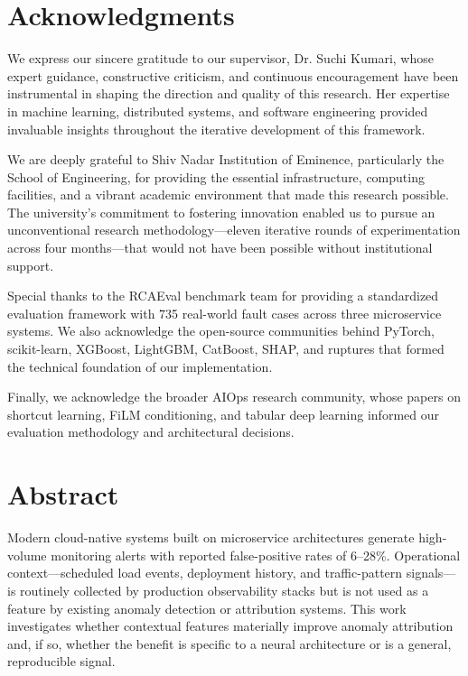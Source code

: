 \documentclass[12pt,a4paper]{report}
\begin{document}
\newpage
\chapter*{Acknowledgments}

We express our sincere gratitude to our supervisor, Dr. Suchi Kumari, whose expert guidance, constructive criticism, and continuous encouragement have been instrumental in shaping the direction and quality of this research. Her expertise in machine learning, distributed systems, and software engineering provided invaluable insights throughout the iterative development of this framework.

We are deeply grateful to Shiv Nadar Institution of Eminence, particularly the School of Engineering, for providing the essential infrastructure, computing facilities, and a vibrant academic environment that made this research possible. The university's commitment to fostering innovation enabled us to pursue an unconventional research methodology---eleven iterative rounds of experimentation across four months---that would not have been possible without institutional support.

Special thanks to the RCAEval benchmark team for providing a standardized evaluation framework with 735 real-world fault cases across three microservice systems. We also acknowledge the open-source communities behind PyTorch, scikit-learn, XGBoost, LightGBM, CatBoost, SHAP, and ruptures that formed the technical foundation of our implementation.

Finally, we acknowledge the broader AIOps research community, whose papers on shortcut learning, FiLM conditioning, and tabular deep learning informed our evaluation methodology and architectural decisions.

\newpage
\chapter*{Abstract}

Modern cloud-native systems built on microservice architectures generate
high-volume monitoring alerts with reported false-positive rates of 6--28\%.
Operational context---scheduled load events, deployment history, and
traffic-pattern signals---is routinely collected by production
observability stacks but is not used as a feature by existing anomaly
detection or attribution systems. This work investigates whether
contextual features materially improve anomaly attribution and, if so,
whether the benefit is specific to a neural architecture or is a general,
reproducible signal.
\end{document}
